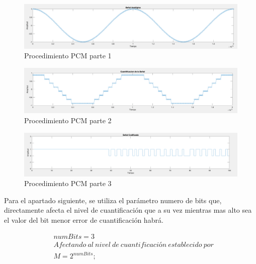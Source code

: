\begin{figure}[H]
    \centering
    \includegraphics[scale=0.2]{Imagenes/senalanalogica.png}
    \caption{Procedimiento PCM parte 1}
    \label{fig:Procedimiento_PCM_parte_1}
\end{figure}


\begin{figure}[H]
    \centering
    \includegraphics[scale=0.2]{Imagenes/cuantizacion.png}
    \caption{Procedimiento PCM parte 2}
    \label{fig:Procedimiento_PCM_parte_2}
\end{figure}

\begin{figure}[H]
    \centering
    \includegraphics[scale=0.2]{Imagenes/codificacion.png}
    \caption{Procedimiento PCM parte 3}
    \label{fig:Procedimiento_PCM_parte_3}
\end{figure}



Para el apartado siguiente, se utiliza el  parámetro numero de bits  que, directamente afecta el nivel de cuantificación que a su vez mientras mas alto sea el valor del bit menor error de cuantificación habrá.

\begin{equation} \label{eq:frecuencia_de_señal_cajo_y_ciclo_de_trabajo}
\begin{split} 
&numBits=3 \\
&Afectando\ al\ nivel\ de\ cuantificación\ establecido\ por \\ 
&M = 2^{numBits}; \\
\end{split} 
\end{equation}


